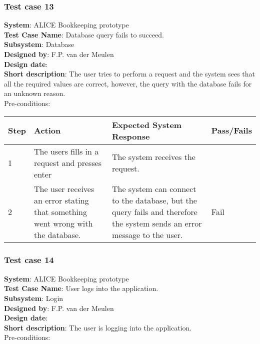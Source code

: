 \subsubsection{Test case 13}
\textbf{System}:  ALICE Bookkeeping prototype \\
\textbf{Test Case Name}:  Database query fails to succeed. \\
\textbf{Subsystem}:  Database \\
\textbf{Designed by}:  F.P. van der Meulen\\
\textbf{Design date}:  \\
\textbf{Short description}: The user tries to perform a request and the system sees that all the required values are correct, however, the query with the database fails for an unknown reason. \\

Pre-conditions: \\

\begin{longtable}{ | p{0.8cm} | p{4.5cm} | p{6cm} | p{1.5cm} |}
\hline
Step & Action & Expected System Response & Pass/Fails  \\ \hline
1 & The users fills in a request and presses enter  & The system receives the request. &  \\ \hline
2 & The user receives an error stating that something went wrong with the database. & The system can connect to the database, but the query fails and therefore the system sends an error message to the user. & Fail \\ \hline
\end{longtable}

\subsubsection{Test case 14}
\textbf{System}:  ALICE Bookkeeping prototype \\
\textbf{Test Case Name}:  User logs into the application. \\
\textbf{Subsystem}:  Login \\
\textbf{Designed by}:  F.P. van der Meulen\\
\textbf{Design date}:  \\
\textbf{Short description}: The user is logging into the application. \\

Pre-conditions: \\

